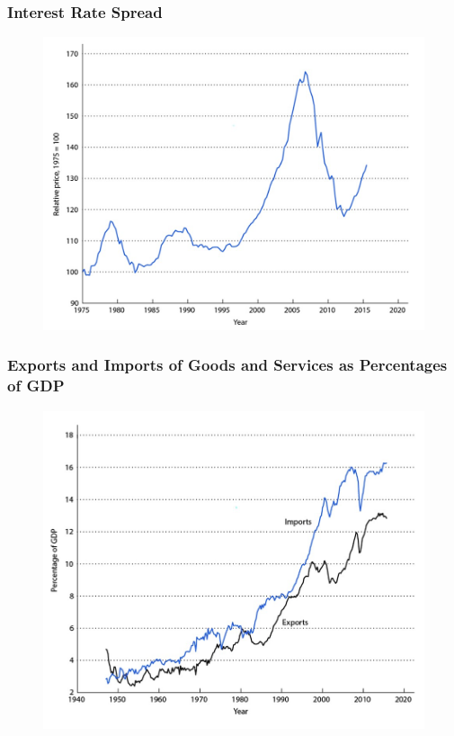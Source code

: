 \documentclass{beamer}
\begin{document}
\begin{frame}
\frametitle[alignment=center]{Interest Rate Spread}
\begin{figure}
\includegraphics[scale=0.6]{Figures/W_Fig_1pt15.png}
\end{figure}
\end{frame}

\begin{frame}
\frametitle[alignment=center]{Exports and Imports of Goods and Services as Percentages of GDP}
\begin{figure}
\includegraphics[scale=0.6]{Figures/W_Fig_1pt16.png}
\end{figure}
\end{frame}
\end{document}
